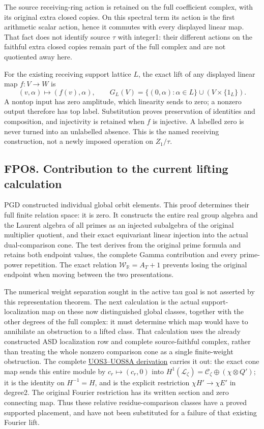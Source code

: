 The source receiving-ring action is retained on the full coefficient
complex, with its original extra closed copies. On this spectral term
its action is the first arithmetic scalar action, hence it commutes with
every displayed linear map. That fact does not identify source \(\tau\)
with integer1: their different actions on the faithful extra closed
copies remain part of the full complex and are not quotiented away here.

For the existing receiving support lattice \(L\), the exact lift of any
displayed linear map \(f:V\to W\) is \[
(v,\alpha)\longmapsto(f(v),\alpha),\qquad
G_L(V)=\{(0,\alpha):\alpha\in L\}\cup(V\times\{1_L\}).
\tag{FPO7.2}
\] A nontop input has zero amplitude, which linearity sends to zero; a
nonzero output therefore has top label. Substitution proves preservation
of identities and composition, and injectivity is retained when \(f\) is
injective. A labelled zero is never turned into an unlabelled absence.
This is the named receiving construction, not a newly imposed operation
on \(Z_1/\tau\).

\subsection{FPO8. Contribution to the current lifting
calculation}\label{fpo8.-contribution-to-the-current-lifting-calculation}

PGD constructed individual global orbit elements. This proof determines
their full finite relation space: it is zero. It constructs the entire
real group algebra and the Laurent algebra of all primes as an injected
subalgebra of the original multiplier quotient, and their exact
equivariant linear injection into the actual dual-comparison cone. The
test derives from the original prime formula and retains both endpoint
values, the complete Gamma contribution and every prime-power
repetition. The exact relation \(\mathcal W_{\mathbb R}=A_T+1\) prevents
losing the original endpoint when moving between the two presentations.

The numerical weight separation sought in the active tau goal is not
asserted by this representation theorem. The next calculation is the
actual support-localization map on these now distinguished global
classes, together with the other degrees of the full complex: it must
determine which map would have to annihilate an obstruction to a lifted
class. That calculation uses the already constructed ASD localization
row and complete source-faithful complex, rather than treating the whole
nonzero comparison cone as a single finite-weight obstruction. The
complete
\href{GLOBAL_UNIT_ORBIT_AND_SUPPORTED_COMPARISON.md}{UOS3--UOS8A
derivation} carries it out: the exact cone map sends this entire module
by \(c_r\mapsto(c_r,0)\) into
\(H^1(\mathcal L_\zeta)=\mathcal C_\zeta\oplus(\chi\otimes Q')\); it is
the identity on \(H^{-1}=H\), and is the explicit restriction
\(\chi H'\to\chi E'\) in degree2. The original Fourier restriction has
its written section and zero connecting map. Thus these relative
residue-comparison classes have a proved supported placement, and have
not been substituted for a failure of that existing Fourier lift.
